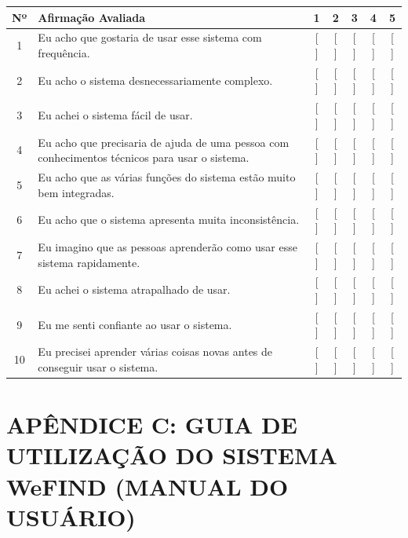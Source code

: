 \vspace{0.5cm}
\begin{table}[H]
\centering
\small
\begin{tabular}{|c|>{\raggedright\arraybackslash}p{8.8cm}|c|c|c|c|c|}
\hline
\textbf{Nº} & \textbf{Afirmação Avaliada} & \textbf{1} & \textbf{2} & \textbf{3} & \textbf{4} & \textbf{5} \\ \hline
1 & Eu acho que gostaria de usar esse sistema com frequência. & [ ] & [ ] & [ ] & [ ] & [ ] \\ \hline
2 & Eu acho o sistema desnecessariamente complexo. & [ ] & [ ] & [ ] & [ ] & [ ] \\ \hline
3 & Eu achei o sistema fácil de usar. & [ ] & [ ] & [ ] & [ ] & [ ] \\ \hline
4 & Eu acho que precisaria de ajuda de uma pessoa com conhecimentos técnicos para usar o sistema. & [ ] & [ ] & [ ] & [ ] & [ ] \\ \hline
5 & Eu acho que as várias funções do sistema estão muito bem integradas. & [ ] & [ ] & [ ] & [ ] & [ ] \\ \hline
6 & Eu acho que o sistema apresenta muita inconsistência. & [ ] & [ ] & [ ] & [ ] & [ ] \\ \hline
7 & Eu imagino que as pessoas aprenderão como usar esse sistema rapidamente. & [ ] & [ ] & [ ] & [ ] & [ ] \\ \hline
8 & Eu achei o sistema atrapalhado de usar. & [ ] & [ ] & [ ] & [ ] & [ ] \\ \hline
9 & Eu me senti confiante ao usar o sistema. & [ ] & [ ] & [ ] & [ ] & [ ] \\ \hline
10 & Eu precisei aprender várias coisas novas antes de conseguir usar o sistema. & [ ] & [ ] & [ ] & [ ] & [ ] \\ \hline
\end{tabular}
\end{table}

\clearpage

\section*{APÊNDICE C: GUIA DE UTILIZAÇÃO DO SISTEMA WeFIND (MANUAL DO USUÁRIO)}

